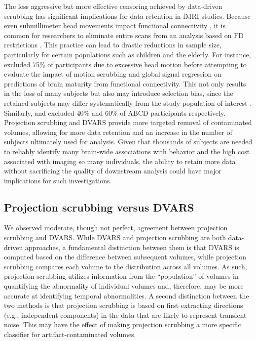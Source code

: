 \documentclass{article}
\begin{document}
The less aggressive but more effective censoring achieved by data-driven scrubbing has significant implications for data retention in fMRI studies. Because even submillimeter head movements impact functional connectivity \citep{powerSpuriousSystematicCorrelations2012, vandijkInfluenceHeadMotion2012, satterthwaiteImpactInScannerHead2012}, it is common for researchers to eliminate entire scans from an analysis based on FD restrictions \citep[see, e.g.,][]{ciricBenchmarkingParticipantlevelConfound2017,parkesEvaluationEfficacyReliability2018}. This practice can lead to drastic reductions in sample size, particularly for certain populations such as children and the elderly. For instance, \cite{Nielsen2019EvaluatingDenoising} excluded 75\% of participants due to excessive head motion before attempting to evaluate the impact of motion scrubbing and global signal regression on predictions of brain maturity from functional connectivity. This not only results in the loss of many subjects but also may introduce selection bias, since the retained subjects may differ systematically from the study population of interest \citep{nebel2022accounting, cosgrove2022limits}. Similarly, \cite{Marek2019IdentifyingStudy} and \cite{Marek2022} excluded 40\% and 60\% of ABCD participants respectively. Projection scrubbing and DVARS provide more targeted removal of contaminated volumes, allowing for more data retention and an increase in the number of subjects ultimately used for analysis. Given that thousands of subjects are needed to reliably identify many brain-wide associations with behavior and the high cost associated with imaging so many individuals, the ability to retain more data without sacrificing the quality of downstream analysis could have major implications for such investigations. 

\subsection{Projection scrubbing versus DVARS}

We observed moderate, though not perfect, agreement between projection scrubbing and DVARS. While DVARS and projection scrubbing are both data-driven approaches, a fundamental distinction between them is that DVARS is computed based on the difference between subsequent volumes, while projection scrubbing compares each volume to the distribution across all volumes. As such, projection scrubbing utilizes information from the ``population'' of volumes in quantifying the abnormality of individual volumes and, therefore, may be more accurate at identifying temporal abnormalities. A second distinction between the two methods is that projection scrubbing is based on first extracting directions (e.g., independent components) in the data that are likely to represent transient noise. This may have the effect of making projection scrubbing a more specific classifier for artifact-contaminated volumes. 
\end{document}
